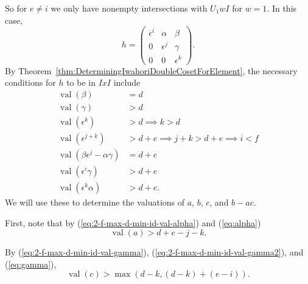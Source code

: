 \documentclass{amsart}
\theoremstyle{definition}
\def\e{\epsilon}
\def\val{\mathop{\mathrm{val}}}
\begin{document}
  So for $e \ne i$ we only have nonempty intersections with $U_1 wI$
  for $w = 1$.  In this case, \begin{equation*}
    h = \begin{pmatrix}
      \e^i & \alpha & \beta \\
      0 & \e^j & \gamma \\
      0 & 0 & \e^k
    \end{pmatrix}.
  \end{equation*}
  By Theorem~\ref{thm:DeterminingIwahoriDoubleCosetForElement}, the necessary
  conditions for $h$ to be in $IxI$ include
  \begin{align}
    \label{eq:2-f-max-d-min-id-val-beta}
    \val(\beta) &= d \\
    \label{eq:2-f-max-d-min-id-val-gamma}
    \val(\gamma) &> d \\
    \label{eq:2-f-max-d-min-id-k-greater-d}
    \val(\e^k) &> d \implies k > d \\
    \label{eq:2-f-max-d-min-id-i-less-f}
    \val(\e^{j+k}) &> d + e \implies j + k > d + e \implies i < f \\
    \label{eq:2-f-max-d-min-id-val-minor}
    \val(\beta\e^j - \alpha\gamma) &= d + e \\
    \label{eq:2-f-max-d-min-id-val-gamma2}
    \val(\e^i \gamma) &> d + e \\
    \label{eq:2-f-max-d-min-id-val-alpha}
    \val(\e^k\alpha) &> d + e.
  \end{align}
  We will use these to determine the valuations of $a$, $b$, $c$, and $b-ac$.

  First, note that by (\ref{eq:2-f-max-d-min-id-val-alpha}) and (\ref{eq:alpha})
  \begin{equation}
    \label{eq:2-f-max-d-min-id-val-a}
    \val(a) > d + e -  j - k.
  \end{equation}

  By (\ref{eq:2-f-max-d-min-id-val-gamma}), (\ref{eq:2-f-max-d-min-id-val-gamma2}),
  and (\ref{eq:gamma}),
  \begin{equation}
    \label{eq:2-f-max-d-min-id-val-c}
    \val(c) > \max(d-k, (d-k) + (e -i)).
  \end{equation}
\end{document}
